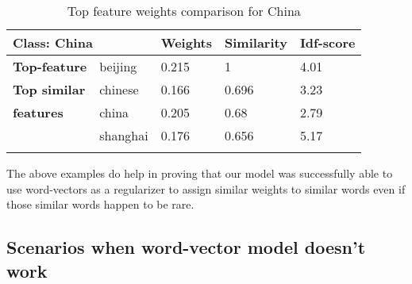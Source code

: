 \begin{table}[htbp]
\begin{tabular}{lllll}
\multicolumn{2}{l|}{\textbf{Class: China}}                                & \multicolumn{1}{l|}{\textbf{Weights}} & \multicolumn{1}{l|}{\textbf{Similarity}} & \textbf{Idf-score} \\ \hline
\multicolumn{1}{l|}{\textbf{Top-feature}} & \multicolumn{1}{l|}{beijing}  & \multicolumn{1}{l|}{0.215}            & \multicolumn{1}{l|}{1}                   & 4.01               \\ \hline
\multicolumn{1}{l|}{\textbf{Top similar}} & \multicolumn{1}{l|}{chinese}  & \multicolumn{1}{l|}{0.166}            & \multicolumn{1}{l|}{0.696}               & 3.23               \\
\multicolumn{1}{l|}{\textbf{features}}    & \multicolumn{1}{l|}{china}    & \multicolumn{1}{l|}{0.205}            & \multicolumn{1}{l|}{0.68}                & 2.79               \\
\multicolumn{1}{l|}{}                     & \multicolumn{1}{l|}{shanghai} & \multicolumn{1}{l|}{0.176}            & \multicolumn{1}{l|}{0.656}               & 5.17               \\
                                          &                               &                                       &                                          &                   
\end{tabular}
\caption{\label{tab:widgets}Top feature weights comparison for China}
\end{table}

The above examples do help in proving that our model was successfully able to use word-vectors as a regularizer to assign similar weights to similar words even if those similar words happen to be rare.

\subsection{Scenarios when word-vector model doesn't work}

